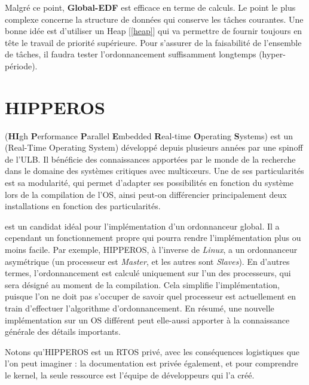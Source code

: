 	
	Malgré ce point, \textbf{Global-EDF} est \og{}efficace\fg{} en terme de calculs.
	Le point le plus complexe concerne la structure de données qui conserve les 
	tâches courantes. Une bonne idée est d'utiliser un Heap [\ref*{heap}] qui 
	va permettre de fournir toujours en tête le travail de priorité supérieure.
	Pour s'assurer de la faisabilité de l'ensemble de tâches, 
	il faudra tester l'ordonnancement suffisamment longtemps (hyper-période).\newline

		
\section{HIPPEROS}
	 (\textbf{HI}gh \textbf{P}erformance \textbf{P}arallel \textbf{E}mbedded \textbf{R}eal-time \textbf{O}perating \textbf{S}ystems)
	est un  (Real-Time Operating System) développé depuis plusieurs années par une spinoff de l'ULB.
	Il bénéficie des connaissances apportées par le monde de la recherche dans 
	le domaine des systèmes critiques avec multic\oe{}urs. Une de ses particularités 
	est sa modularité, qui permet d'adapter ses possibilités en fonction du système 
	lors de la compilation de l'OS, ainsi peut-on différencier principalement 
	deux installations en fonction des particularités. 
	
	 est un candidat idéal pour l'implémentation d'un ordonnanceur 
	global. Il a cependant un fonctionnement propre qui pourra rendre l'implémentation 
	plus ou moins facile. Par exemple, HIPPEROS, à l'inverse de \textit{Linux}, a un ordonnanceur 
	asymétrique (un processeur est \textit{Master}, et les autres sont \textit{Slaves}).
	En d'autres termes, l'ordonnancement est calculé uniquement sur l'un des processeurs, 
	qui sera désigné au moment de la compilation. 
	Cela simplifie l'implémentation, puisque l'on ne doit pas s'occuper de savoir quel processeur est 
	actuellement en train d'effectuer l'algorithme d'ordonnancement.\newline
	En résumé, une nouvelle implémentation sur un OS différent 
	peut elle-aussi apporter à la connaissance générale des détails importants.\newline
	
	Notons qu'HIPPEROS est un RTOS privé, avec les conséquences logistiques que l'on peut 
	imaginer : la documentation est privée également, et pour comprendre le kernel, la 
	seule ressource est l'équipe de développeurs qui l'a créé. 
	
